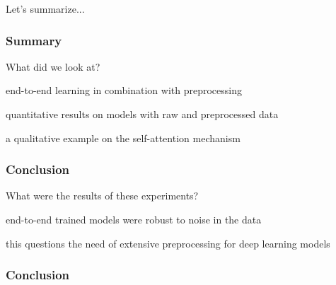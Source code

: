 \documentclass[%
  aspectratio=169,
  9pt,
  english,
  light,
  mathserif,
  professionalfont,
  affiliationintitlepagehead,
  titlegraphic,
   affiliation,
]{beamer}
\begin{document}
{


{
	\begin{frame}[plain]
	
	\vspace{8em}
	\begin{center}
		\Huge\color{white}
		Let's summarize...
	\end{center}\color{white}
	
\end{frame}
}

\begin{frame}
\frametitle{Summary}
\Large 

\begin{leftbubbles}
	What did we look at?
\end{leftbubbles}

\pause
\begin{rightbubbles}
	end-to-end learning in combination with preprocessing
\end{rightbubbles}

\pause
\begin{rightbubbles}
	quantitative results on models with raw and preprocessed data
\end{rightbubbles}

\pause
\begin{rightbubbles}
	a qualitative example on the self-attention mechanism
\end{rightbubbles}

\end{frame}

\begin{frame}
\frametitle{Conclusion}
\Large 

\begin{leftbubbles}
	What were the results of these experiments?
\end{leftbubbles}

\pause
\begin{rightbubbles}
	end-to-end trained models were robust to noise in the data
\end{rightbubbles}

\pause
\begin{rightbubbles}
	this questions the need of extensive preprocessing for deep learning models
\end{rightbubbles}

\end{frame}
\frametitle{Conclusion}

\begin{frame}
	\Large
	

\end{frame}}
\end{document}
